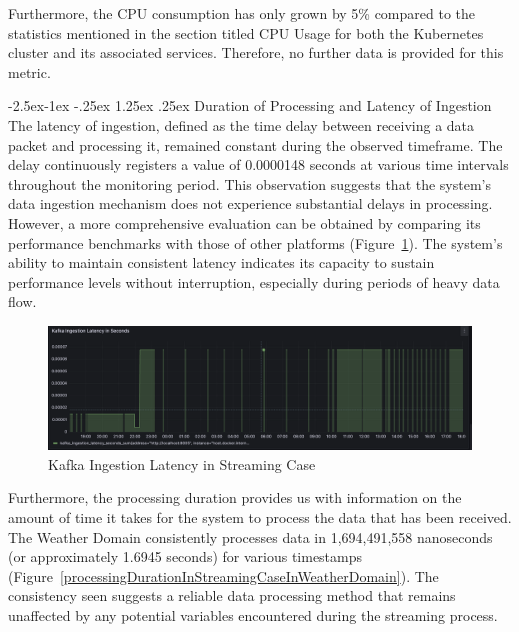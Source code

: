 \documentclass[preprint,12pt]{elsarticle}
\makeatletter
\renewcommand\paragraph{\@startsection{paragraph}{4}{\z@}%
            {-2.5ex\@plus -1ex \@minus -.25ex}%
            {1.25ex \@plus .25ex}%
            {\normalfont\normalsize\itshape}}
\makeatother
\begin{document}
Furthermore, the CPU consumption has only grown by 5\% compared to the statistics mentioned in the section titled CPU Usage for both the Kubernetes cluster and its associated services. Therefore, no further data is provided for this metric.

\paragraph{Duration of Processing and Latency of Ingestion} The latency of ingestion, defined as the time delay between receiving a data packet and processing it, remained constant during the observed timeframe. The delay continuously registers a value of 0.0000148 seconds at various time intervals throughout the monitoring period. This observation suggests that the system's data ingestion mechanism does not experience substantial delays in processing. However, a more comprehensive evaluation can be obtained by comparing its performance benchmarks with those of other platforms (Figure~\ref{kafkaIngestionLatencyInStreamingCase}). The system's ability to maintain consistent latency indicates its capacity to sustain performance levels without interruption, especially during periods of heavy data flow.

\begin{figure}

  \centering

  \includegraphics[width=\textwidth]{images/kafka-ingestion-latency-sum-streaming-case.png}

  \caption{Kafka Ingestion Latency in Streaming Case}

  \label{kafkaIngestionLatencyInStreamingCase}

\end{figure}

Furthermore, the processing duration provides us with information on the amount of time it takes for the system to process the data that has been received. The Weather Domain consistently processes data in 1,694,491,558 nanoseconds (or approximately 1.6945 seconds) for various timestamps (Figure~\ref{processingDurationInStreamingCaseInWeatherDomain}). The consistency seen suggests a reliable data processing method that remains unaffected by any potential variables encountered during the streaming process.
\end{document}
